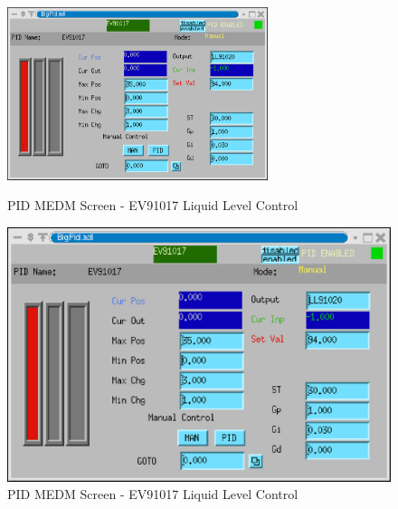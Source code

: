 \begin{figure}[h!]
\begin{latexonly}
\centering
\includegraphics[width=3in]{beamline/ev91017.eps}
\caption{PID MEDM Screen - EV91017 Liquid Level Control}
\label{fig:ev17llc}
\end{latexonly}
\begin{htmlonly}
\includegraphics{beamline/ev91017.eps}
\caption{PID MEDM Screen - EV91017 Liquid Level Control}
\label{fig:ev17llc}
\end{htmlonly}
\end{figure}


